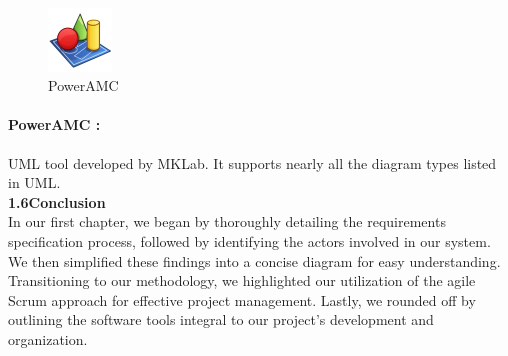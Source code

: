 \documentclass{article}
\begin{document}
\begin{figure}[htbp]
    \centering
    \includegraphics[width=0.15\textwidth]{slm}
    \caption{PowerAMC }
    \label{fig:design6}
\end{figure}
\paragraph{PowerAMC :} 
UML tool developed by MKLab. It supports nearly all the diagram types listed in UML.\vspace{1cm}\\
{\Large \textbf{1.6\hspace{1em}Conclusion}}\vspace{0.2cm}\\
In our first chapter, we began by thoroughly detailing the requirements specification process, followed by identifying the actors involved in our system. We then simplified these findings into a concise diagram for easy understanding. Transitioning to our methodology, we highlighted our utilization of the agile Scrum approach for effective project management. Lastly, we rounded off by outlining the software tools integral to our project's development and organization.








       
\end{document}
